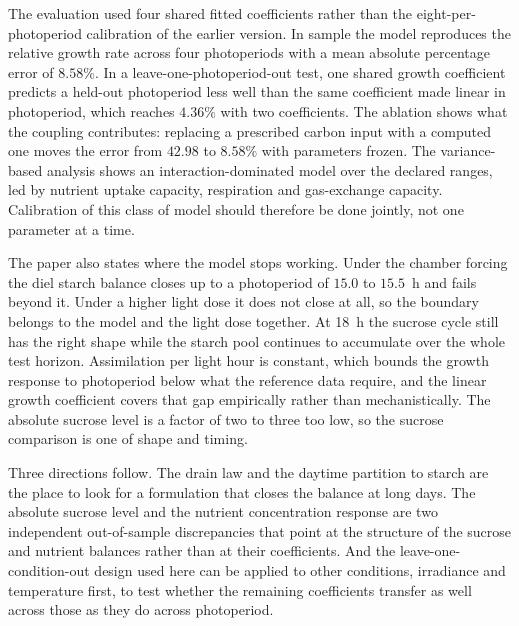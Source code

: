 The evaluation used four shared fitted coefficients rather than the
eight-per-photoperiod calibration of the earlier version. In sample the model
reproduces the relative growth rate across four photoperiods with a mean
absolute percentage error of $8.58\%$. In a leave-one-photoperiod-out test, one
shared growth coefficient predicts a held-out photoperiod less well than the
same coefficient made linear in photoperiod, which reaches $4.36\%$ with two
coefficients. The ablation shows what the coupling contributes: replacing a
prescribed carbon input with a computed one moves the error from $42.98$ to
$8.58\%$ with parameters frozen. The variance-based analysis shows an
interaction-dominated model over the declared ranges, led by nutrient uptake
capacity, respiration and gas-exchange capacity. Calibration of this class of
model should therefore be done jointly, not one parameter at a time.

The paper also states where the model stops working. Under the chamber forcing the diel
starch balance closes up to a photoperiod of $15.0$ to $15.5$~h and fails
beyond it. Under a higher light dose it does not close at all, so the boundary
belongs to the model and the light dose together. At 18~h the sucrose
cycle still has the right shape while the starch pool continues to accumulate
over the whole test horizon. Assimilation per light hour is constant, which bounds the growth
response to photoperiod below what the reference data require, and the linear
growth coefficient covers that gap empirically rather than mechanistically. The
absolute sucrose level is a factor of two to three too low, so the sucrose
comparison is one of shape and timing.

Three directions follow. The drain law and the daytime partition to starch are
the place to look for a formulation that closes the balance at long days.
The absolute sucrose level and the nutrient concentration response are two
independent out-of-sample discrepancies that point at the structure of the
sucrose and nutrient balances rather than at their coefficients. And the
leave-one-condition-out design used here can be applied to other conditions,
irradiance and temperature first, to test whether the remaining coefficients
transfer as well across those as they do across photoperiod.
